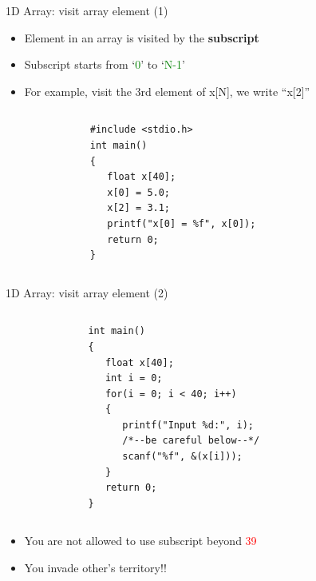 \begin{frame}[fragile]{1D Array: visit array element (1)}
\begin{itemize}
	\item {Element in an array is visited by the \textbf{subscript}}
	\item {Subscript starts from `\textcolor{green}{0}' to `\textcolor{green}{N-1}'}
	\item {For example, visit the 3rd element of x[N], we write ``x[2]''}
\end{itemize}
\begin{columns}
\begin{column}{0.2\linewidth}
\end{column}
\begin{column}{0.5\linewidth}
\begin{lstlisting}
#include <stdio.h>
int main()
{
   float x[40];
   x[0] = 5.0;
   x[2] = 3.1;
   printf("x[0] = %f", x[0]);
   return 0;
}

\end{lstlisting}
\end{column}
\begin{column}{0.2\linewidth}
\end{column}
\end{columns}
\end{frame}

\begin{frame}[fragile]{1D Array: visit array element (2)}
\begin{columns}
\begin{column}{0.2\linewidth}
\end{column}
\begin{column}{0.52\linewidth}
\begin{lstlisting}
int main()
{
   float x[40];
   int i = 0;
   for(i = 0; i < 40; i++)
   {
      printf("Input %d:", i);
      /*--be careful below--*/
      scanf("%f", &(x[i])); 
   }
   return 0;
}
\end{lstlisting}
\end{column}
\begin{column}{0.2\linewidth}
\end{column}
\end{columns}
\begin{itemize}
	\item {You are not allowed to use subscript beyond \textcolor{red}{39}}
	\item {You invade other's territory!!}
\end{itemize}
\end{frame}

